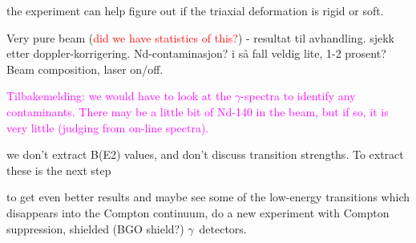 \documentclass[twoside,english]{uiofysmaster/uiofysmaster}
\newcommand{\ga}{$\gamma$}
\begin{document}
\bigskip

the experiment can help figure out if the triaxial deformation is rigid or soft.

\bigskip

Very pure beam (\textcolor{red}{did we have statistics of this?}) - resultat til avhandling. sjekk etter doppler-korrigering. Nd-contaminasjon? i så fall veldig lite, 1-2 prosent? Beam composition, laser on/off.

\textcolor{Magenta}{Tilbakemelding: \newline
we would have to look at the \ga-spectra to identify any contaminants. There may be a little bit of Nd-140 in the beam, but if so, it is very little (judging from on-line spectra).}

\bigskip

we don't extract B(E2) values, and don't discuss transition strengths. To extract these is the next step

\bigskip

to get even better results and maybe see some of the low-energy transitions which disappears into the Compton continuum, do a new experiment with Compton suppression, shielded (BGO shield?) \ga\ detectors.


%	






\end{document}
